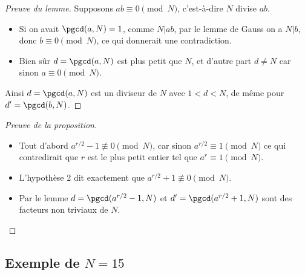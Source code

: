 \documentclass[11pt,class=report,crop=false]{standalone}
\begin{document}
\begin{proof}[Preuve du lemme]
Supposons $ab \equiv 0 \pmod N$, c'est-à-dire $N$ divise $ab$.
\begin{itemize}
	\item Si on avait $\pgcd(a,N) = 1$, comme $N|ab$, par le lemme de Gauss on a $N|b$, donc $b\equiv 0 \pmod N$, ce qui donnerait une contradiction.
	\item Bien sûr $d =\pgcd(a,N)$ est plus petit que $N$, et d'autre part $d \neq N$ car sinon $a \equiv 0 \pmod{N}$.
\end{itemize}
Ainsi $d=\pgcd(a,N)$ est un diviseur de $N$ avec $1<d<N$, de même pour $d'=\pgcd(b,N)$.
\end{proof}

\begin{proof}[Preuve de la proposition]
~
\begin{itemize}	
	\item Tout d'abord $a^{r/2}-1 \not\equiv 0 \pmod N$, car sinon $a^{r/2} \equiv 1 \pmod N$ ce qui contredirait que $r$ est le plus petit entier tel que $a^r \equiv 1 \pmod N$.
	\item L'hypothèse 2 dit exactement que $a^{r/2}+1 \not\equiv 0 \pmod N$.
	\item Par le lemme $d = \pgcd(a^{r/2}-1,N)$ et $d' = \pgcd(a^{r/2}+1,N)$ sont des facteurs non triviaux de $N$.
\end{itemize}
\end{proof}

\subsection{Exemple de $N=15$}
\end{document}
